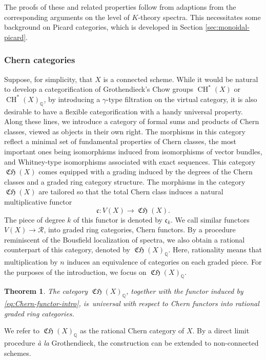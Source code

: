 \documentclass[11pt]{article}
\theoremstyle{plain}
\newtheorem{thm}{Theorem}
\theoremstyle{definition}
\newcommand{\QBbb}{\mathbb Q}
\newcommand{\Rcal}{\mathcal R}
\newcommand{\cfrak}{\mathfrak c}
\DeclareMathOperator{\CH}{CH}
\DeclareMathOperator{\CHfrak}{\mathfrak{CH}}
\begin{document}
The proofs of these and related properties follow from adaptions from the corresponding arguments on the level of $K$-theory spectra. This necessitates some background on Picard categories, which is developed in Section \ref{sec:monoidal-picard}.

\subsubsection*{Chern categories} Suppose, for simplicity, that $X$ is a connected scheme. While it would be natural to develop a categorification of Grothendieck's Chow groups $\CH^{\ast}(X)$ or $\CH^{\ast}(X)_\QBbb$, by introducing a $\gamma$-type filtration on the virtual category, it is also desirable to have a flexible categorification with a handy universal property. Along these lines, we introduce a category of formal sums and products of Chern classes, viewed as objects in their own right. The morphisms in this category reflect a minimal set of fundamental properties of Chern classes, the most important ones being isomorphisms induced from isomorphisms of vector bundles, and Whitney-type isomorphisms associated with exact sequences. This category $\CHfrak(X)$ comes equipped with a grading induced by the degrees of the Chern classes and a graded ring category structure. The morphisms in the category $\CHfrak(X)$ are tailored so that the total Chern class induces a natural multiplicative functor
\begin{equation}\label{eq:Chern-functor-intro}
\cfrak: V(X) \to \CHfrak(X).
\end{equation}
The piece of degree $k$ of this functor is denoted by $\cfrak_{k}$. We call similar functors \hbox{$ V(X) \to \Rcal$}, into graded ring categories, Chern functors. By a procedure \hbox{reminiscent} of the Bousfield localization of spectra, we also obtain a rational counterpart of this category, denoted by $\CHfrak(X)_{\QBbb}$. Here, rationality means that multiplication by $n$ induces an equivalence of categories on each graded piece. For the purposes of the introduction, we focus on $\CHfrak(X)_\QBbb$.

\begin{thm}\label{thm:B}
The category $\CHfrak(X)_\QBbb$, together with the functor induced by \eqref{eq:Chern-functor-intro}, is~universal with respect to Chern functors into rational graded ring categories.

\end{thm}
We refer to $\CHfrak(X)_\QBbb$ as the rational Chern category of $X$. By a direct limit procedure \emph{à la} Grothendieck, the construction can be extended to non-connected schemes.
\end{document}
